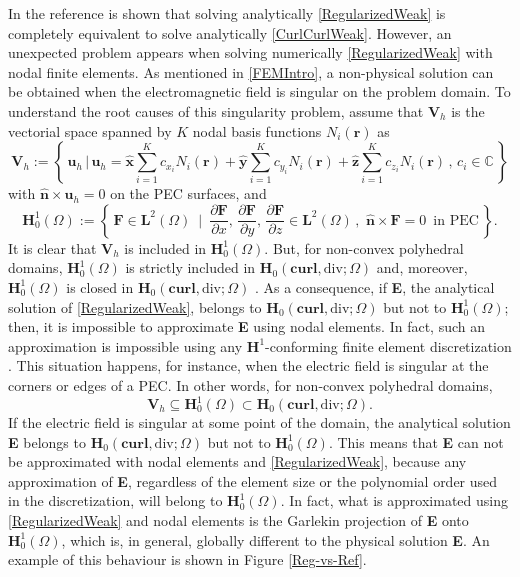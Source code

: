 In the reference \cite{BC-OJOOut} is shown that solving analytically \eqref{RegularizedWeak} is completely equivalent to solve analytically \eqref{CurlCurlWeak}. However, an unexpected problem appears when solving numerically \eqref{RegularizedWeak} with nodal finite elements. As mentioned in \ref{FEMIntro}, a non-physical solution can be obtained when the electromagnetic field is singular on the problem domain. To understand the root causes of this singularity problem, assume that $\mathbf{V}_{h}$ is the vectorial space spanned by $K$ nodal basis functions $N_{i}(\mathbf{r})$ as
\[
\mathbf{V}_{h}:=\left\{\,\mathbf{u}_{h}\,|\,\mathbf{u}_{h} =
\mathbf{\hat{x}}\sum^{K}_{i=1} c_{x_{i}}N_{i}(\mathbf{r}) +
\mathbf{\hat{y}}\sum^{K}_{i=1} c_{y_{i}}N_{i}(\mathbf{r}) +
\mathbf{\hat{z}}\sum^{K}_{i=1} c_{z_{i}}N_{i}(\mathbf{r})\, ,\, 
c_{i} \in \mathbb{C}\,\right\}
\]
with $\mathbf{\hat{n}}\times\mathbf{u}_{h} = 0$ on the PEC surfaces, and
\[
\mathbf{H}^{1}_{0}(\Omega):=\left\{\,\mathbf{F}\in \mathbf{L}^{2}(\Omega)\,\,\,|\,\,\,
\frac{\partial\mathbf{F}}{\partial x},\,
\frac{\partial\mathbf{F}}{\partial y},\,
\frac{\partial\mathbf{F}}{\partial z} \in 
\mathbf{L}^{2}(\Omega)\, , \,\,\mathbf{\hat{n}}\times\mathbf{F} = 0\enspace\text{in PEC}\,\right\}.
\]
It is clear that $\mathbf{V}_{h}$ is included in $\mathbf{H}^{1}_{0}(\Omega)$. But, for non-convex polyhedral
domains, $\mathbf{H}^{1}_{0}(\Omega)$ is strictly included in $\mathbf{H}_{0}(\mathbf{curl},\text{div};\Omega)$ and, moreover, $\mathbf{H}^{1}_{0}(\Omega)$ is closed in $\mathbf{H}_{0}(\mathbf{curl},\text{div};\Omega)$
\cite{CostabelH1CloseH, WeightedRegularizedME}. As a consequence, if \textbf{E}, the analytical solution of \eqref{RegularizedWeak}, belongs to $\mathbf{H}_{0}(\mathbf{curl},\text{div};\Omega)$ but not to $\mathbf{H}^{1}_{0}(\Omega)$; then, it is impossible to approximate \textbf{E} using nodal elements. In fact, such an approximation is impossible using any $\mathbf{H}^{1}$-conforming finite element discretization \cite{CostabelH1Impossible}. This situation happens, for instance, when the electric field is
singular at the corners or edges of a PEC. In other words, for non-convex polyhedral domains,
\[
\mathbf{V}_{h}\subseteq\mathbf{H}^{1}_{0}(\Omega)
\subset\mathbf{H}_{0}(\mathbf{curl},\text{div};\Omega).
\]
If the electric field is singular at some point of the domain, the analytical solution \textbf{E} belongs to
$\mathbf{H}_{0}(\mathbf{curl},\text{div};\Omega)$ but not to $\mathbf{H}^{1}_{0}(\Omega)$. This means that \textbf{E} can not be approximated with nodal elements and \eqref{RegularizedWeak}, because any approximation of \textbf{E}, regardless of the element size or the polynomial order used in the discretization, will belong to $\mathbf{H}^{1}_{0}(\Omega)$. In fact, what is approximated using \eqref{RegularizedWeak} and nodal elements is the Garlekin projection of \textbf{E} onto $\mathbf{H}^{1}_{0}(\Omega)$, which is, in general, globally
different to the physical solution \textbf{E}. An example of this behaviour is shown in Figure \ref{Reg-vs-Ref}.

